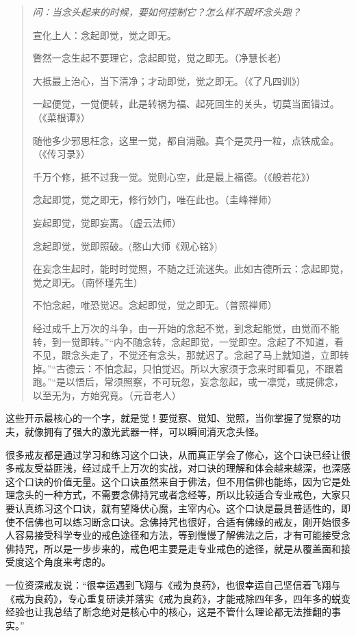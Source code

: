\begin{quotation}\it
    问：当念头起来的时候，要如何控制它？怎么样不跟坏念头跑？

    宣化上人：念起即觉，觉之即无。

    瞥然一念生起不要理它，念起即觉，觉之即无。（净慧长老）

    大抵最上治心，当下清净；才动即觉，觉之即无。（《了凡四训》）

    一起便觉，一觉便转，此是转祸为福、起死回生的关头，切莫当面错过。（《菜根谭》）

    随他多少邪思枉念，这里一觉，都自消融。真个是灵丹一粒，点铁成金。（《传习录》）

    千万个修，抵不过我一觉。觉则心空，此是最上福德。（《般若花》）

    念起即觉，觉之即无，修行妙门，唯在此也。（圭峰禅师）

    妄起即觉，觉即妄离。（虚云法师）

    念起即觉，觉即照破。(憨山大师《观心铭》)

    在妄念生起时，能时时觉照，不随之迁流迷失。此如古德所云：念起即觉，觉之即无。（南怀瑾先生）

    不怕念起，唯恐觉迟。念起即觉，觉之即无。（普照禅师）

    经过成千上万次的斗争，由一开始的念起不觉，到念起能觉，由觉而不能转，到一觉即转。”“内不随念转，念起即觉，一觉即空。念起了不知道，看不见，跟念头走了，不觉还有念头，那就迟了。念起了马上就知道，立即转掉。”“古德云：不怕念起，只怕觉迟。所以大家须于念来时即看见，不跟着跑。”“是以悟后，常须照察，不可玩忽，妄念忽起，或一凛觉，或提佛念，以至无为，方始究竟。（元音老人）
\end{quotation}

这些开示最核心的一个字，就是觉！要觉察、觉知、觉照，当你掌握了觉察的功夫，就像拥有了强大的激光武器一样，可以瞬间消灭念头怪。

很多戒友都是通过学习和练习这个口诀，从而真正学会了修心，这个口诀已经让很多戒友受益匪浅，经过成千上万次的实战，对口诀的理解和体会越来越深，也深感这个口诀的价值无量。这个口诀虽然来自于佛法，但不用信佛也能练，因为它是处理念头的一种方式，不需要念佛持咒或者念经等，所以比较适合专业戒色，大家只要认真练习这个口诀，就有望降伏心魔，主宰内心。这个口诀是最具普适性的，即使不信佛也可以练习断念口诀。念佛持咒也很好，合适有佛缘的戒友，刚开始很多人容易接受科学专业的戒色途径和方法，等到慢慢了解佛法之后，才有可能接受念佛持咒，所以是一步步来的，戒色吧主要是走专业戒色的途径，就是从覆盖面和接受度这个角度来考虑的。

一位资深戒友说：“很幸运遇到飞翔与《戒为良药》，也很幸运自己坚信着飞翔与《戒为良药》，专心重复研读并落实《戒为良药》，才能戒除四年多，四年多的蜕变经验也让我总结了断念绝对是核心中的核心，这是不管什么理论都无法推翻的事实。”

